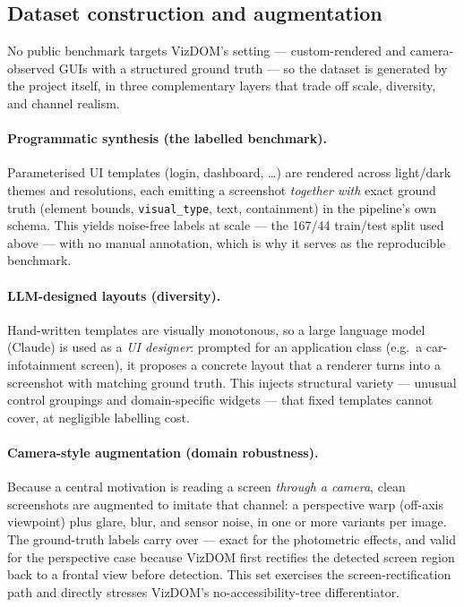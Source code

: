 \documentclass[11pt,a4paper]{article}
\newcommand{\code}[1]{\texttt{#1}}
\begin{document}
\subsection{Dataset construction and augmentation}
No public benchmark targets VizDOM's setting --- custom-rendered and camera-observed
GUIs with a structured ground truth --- so the dataset is generated by the project
itself, in three complementary layers that trade off scale, diversity, and channel
realism.

\paragraph{Programmatic synthesis (the labelled benchmark).} Parameterised UI
templates (login, dashboard, \dots) are rendered across light/dark themes and
resolutions, each emitting a screenshot \emph{together with} exact ground truth
(element bounds, \code{visual\_type}, text, containment) in the pipeline's own
schema. This yields noise-free labels at scale --- the 167/44 train/test split used
above --- with no manual annotation, which is why it serves as the reproducible
benchmark.

\paragraph{LLM-designed layouts (diversity).} Hand-written templates are visually
monotonous, so a large language model (Claude) is used as a \emph{UI designer}:
prompted for an application class (e.g.\ a car-infotainment screen), it proposes a
concrete layout that a renderer turns into a screenshot with matching ground truth.
This injects structural variety --- unusual control groupings and domain-specific
widgets --- that fixed templates cannot cover, at negligible labelling cost.

\paragraph{Camera-style augmentation (domain robustness).} Because a central
motivation is reading a screen \emph{through a camera}, clean screenshots are
augmented to imitate that channel: a perspective warp (off-axis viewpoint) plus
glare, blur, and sensor noise, in one or more variants per image. The ground-truth
labels carry over --- exact for the photometric effects, and valid for the
perspective case because VizDOM first rectifies the detected screen region back to a
frontal view before detection. This set exercises the screen-rectification path and
directly stresses VizDOM's no-accessibility-tree differentiator.
\end{document}
